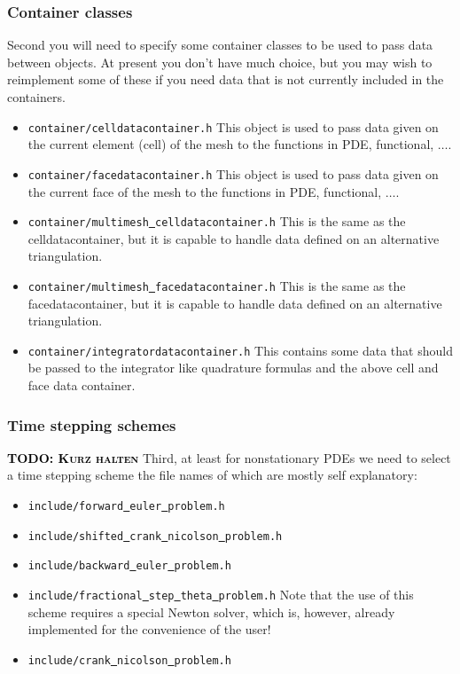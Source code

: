 \documentclass[prodmode,acmtoms]{acmsmall}
\numberwithin{equation}{section}
\newcommand{\todo}[1]{\textbf{\textsc{\textcolor{black}{TODO: #1}}}}
\begin{document}
\subsubsection{Container classes}
Second you will need to specify some container classes to be used to 
pass data between objects. At present you don't have much choice, but you may wish 
to reimplement some of these if you need data that is not currently included in 
the containers.
\begin{itemize}
\item \texttt{container/celldatacontainer.h} This object is used to pass data 
  given on the current element (cell) of the mesh to the functions in PDE, functional, 
  $\ldots$. 
\item \texttt{container/facedatacontainer.h} This object is used to pass data 
  given on the current face of the mesh to the functions in PDE, functional, 
  $\ldots$. 
\item \texttt{container/multimesh\underline{ }celldatacontainer.h} This is the same as the 
  celldatacontainer, but it
  is capable to handle data defined on an alternative triangulation.
\item \texttt{container/multimesh\underline{ }facedatacontainer.h} This is the same as the
  facedatacontainer, but it
  is capable to handle data defined on an alternative triangulation.
\item \texttt{container/integratordatacontainer.h} This contains some data that 
  should be passed to the integrator like quadrature formulas and the above cell and 
  face data container.
\end{itemize}


\subsubsection{Time stepping schemes}
\todo{Kurz halten}
Third, at least for nonstationary PDEs we need to select a time stepping scheme
the file names of which are mostly self explanatory:
\begin{itemize}
\item \texttt{include/forward\underline{ }euler\underline{ }problem.h}
\item \texttt{include/shifted\underline{ }crank\underline{ }nicolson\underline{ }problem.h}
\item \texttt{include/backward\underline{ }euler\underline{ }problem.h}
\item \texttt{include/fractional\underline{ }step\underline{ }theta\underline{ }problem.h} Note that the use of this scheme requires a special Newton solver, which is, however, already
implemented for the convenience of the user!
\item \texttt{include/crank\underline{ }nicolson\underline{ }problem.h}
\end{itemize}
\end{document}

